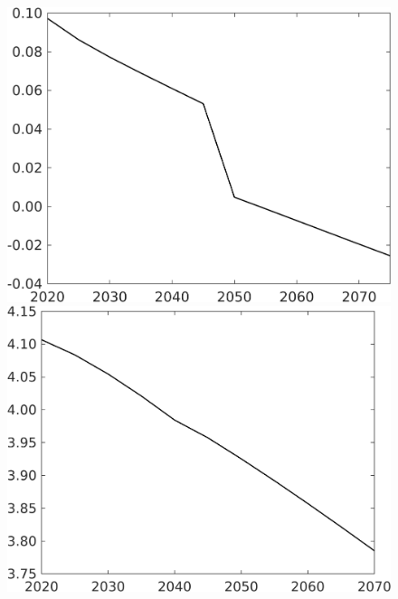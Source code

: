 \documentclass[12pt]{article}
\begin{document}
\begin{figure}[h!!]
\begin{minipage}[]{0.32\textwidth}
	\end{minipage}
	\begin{minipage}[]{0.32\textwidth}
		\includegraphics[width=1\textwidth]{../../codding_model/own_basedOnFried/optimalPol_010922_revision/figures/all_13Sept22/CompTaufPER_bytaul_Reg0_sn_spillover0_nsk1_xgr0_knspil0_sep1_LFlimit1_emsbase0_countec0_GovRev0_etaa0.79_lgd0.png}
	\end{minipage}		
	\begin{minipage}[]{0.32\textwidth}
		\includegraphics[width=1\textwidth]{../../codding_model/own_basedOnFried/optimalPol_010922_revision/figures/all_13Sept22/CompTaufPER_bytaul_Reg0_gAf_spillover0_nsk1_xgr0_knspil0_sep1_LFlimit1_emsbase0_countec0_GovRev0_etaa0.79_lgd0.png}

\end{minipage}
\end{figure}
\end{document}
